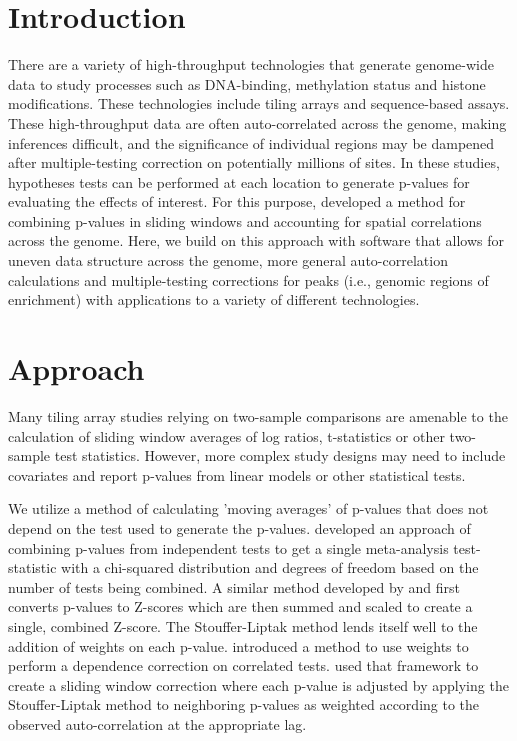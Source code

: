 \documentclass{bioinfo}
\begin{document}
\section{Introduction}
There are a variety of high-throughput technologies that generate
genome-wide data to study processes such as DNA-binding, methylation
status and histone modifications. These technologies include tiling
arrays and sequence-based assays. These high-throughput data
are often auto-correlated across
the genome, making inferences difficult, and the significance of
individual regions may be dampened after multiple-testing correction
on potentially millions of sites.
In these studies, hypotheses tests can be performed at each location to
generate p-values for evaluating the effects of interest. For this
purpose, \cite{Kechris2010} developed a method for combining p-values
in sliding windows and accounting for spatial correlations across the
genome. Here, we build on this approach with software
that allows for uneven data structure across the genome, more general
auto-correlation calculations and multiple-testing corrections for peaks
(i.e., genomic regions of enrichment) with applications to a variety of
different technologies.

\section{Approach}
Many tiling array studies relying on two-sample comparisons are
amenable to the calculation of sliding window averages of log ratios,
t-statistics or other two-sample test statistics. However,
more complex study designs may need to include covariates and report
p-values from linear models or other statistical tests.

We utilize a method of calculating 'moving averages' of p-values that
does not depend on the test used to generate the p-values. \cite{Fisher}
developed an approach of combining p-values from independent tests to
get a single meta-analysis test-statistic with a chi-squared
distribution and degrees of freedom based on the number of tests being
combined.  A similar method developed by \cite{Stouffer} and
\cite{Liptak} first converts p-values to Z-scores which are then summed
and scaled to create a single, combined Z-score.  The Stouffer-Liptak
method lends itself well to the addition of weights on each p-value.
\cite{Zaykin2002} introduced a method to use weights to perform a
dependence correction on correlated tests. \cite{Kechris2010} used that
framework to create a sliding window correction where each p-value is
adjusted by applying the Stouffer-Liptak method to neighboring p-values
as weighted according to the observed auto-correlation at the
appropriate lag.
\end{document}
